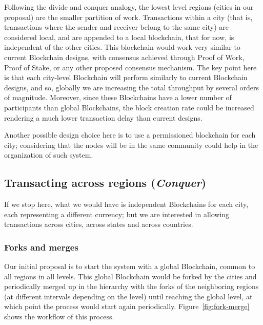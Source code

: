 Following the divide and conquer analogy, the lowest level regions (cities in
our proposal) are the smaller partition of work.  Transactions within a city
(that is, transactions where the sender and receiver belong to the same city)
are considered local, and are appended to a local blockchain, that for now, is
independent of the other cities.  This blockchain would work very similar to
current Blockchain designs, with consensus achieved through Proof of Work,
Proof of Stake, or any other proposed consensus mechanism.  The key point here
is that each city-level Blockchain will perform similarly to current Blockchain
designs, and so, globally we are increasing the total throughput by several
orders of magnitude.  Moreover, since these Blockchains have a lower number of
participants than global Blockchains, the block creation rate could be
increased rendering a much lower transaction delay than current designs.

Another possible design choice here is to use a permissioned blockchain for
each city; considering that the nodes will be in the same community could help
in the organization of such system.

\subsection{Transacting across regions (\textit{Conquer})}

If we stop here, what we would have is independent Blockchains for each city,
each representing a different currency; but we are interested in allowing
transactions across cities, across states and across countries.

\subsubsection{Forks and merges}

Our initial proposal is to start the system with a global Blockchain, common to
all regions in all levels.  This global Blockchain would be forked by the
cities and periodically merged up in the hierarchy with the forks of the
neighboring regions (at different intervals depending on the level) until
reaching the global level, at which point the process would start again
periodically.  Figure~\ref{fig:fork-merge} shows the workflow of this process.

